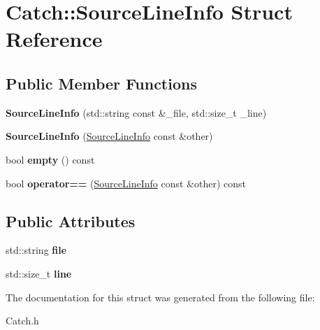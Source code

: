 \hypertarget{struct_catch_1_1_source_line_info}{\section{Catch\-:\-:Source\-Line\-Info Struct Reference}
\label{struct_catch_1_1_source_line_info}
}
\subsection*{Public Member Functions}
\begin{DoxyCompactItemize}
\item 
\hypertarget{struct_catch_1_1_source_line_info_ad75af709941dae9fcb07b7c5cd18294f}{{\bfseries Source\-Line\-Info} (std\-::string const \&\-\_\-file, std\-::size\-\_\-t \-\_\-line)}\label{struct_catch_1_1_source_line_info_ad75af709941dae9fcb07b7c5cd18294f}

\item 
\hypertarget{struct_catch_1_1_source_line_info_a1ec99cc0547ce5909133aaa8f14ed4b1}{{\bfseries Source\-Line\-Info} (\hyperlink{struct_catch_1_1_source_line_info}{Source\-Line\-Info} const \&other)}\label{struct_catch_1_1_source_line_info_a1ec99cc0547ce5909133aaa8f14ed4b1}

\item 
\hypertarget{struct_catch_1_1_source_line_info_a9a25ffc0640d1a3dd0c9b7e5fcbba7b9}{bool {\bfseries empty} () const }\label{struct_catch_1_1_source_line_info_a9a25ffc0640d1a3dd0c9b7e5fcbba7b9}

\item 
\hypertarget{struct_catch_1_1_source_line_info_af0854821b1abfda52796ef0f1294b050}{bool {\bfseries operator==} (\hyperlink{struct_catch_1_1_source_line_info}{Source\-Line\-Info} const \&other) const }\label{struct_catch_1_1_source_line_info_af0854821b1abfda52796ef0f1294b050}

\end{DoxyCompactItemize}
\subsection*{Public Attributes}
\begin{DoxyCompactItemize}
\item 
\hypertarget{struct_catch_1_1_source_line_info_adf3ccf0c2bd326eb3466318af82a94dd}{std\-::string {\bfseries file}}\label{struct_catch_1_1_source_line_info_adf3ccf0c2bd326eb3466318af82a94dd}

\item 
\hypertarget{struct_catch_1_1_source_line_info_a841e5d696c7b9cde24e45e61dd979c77}{std\-::size\-\_\-t {\bfseries line}}\label{struct_catch_1_1_source_line_info_a841e5d696c7b9cde24e45e61dd979c77}

\end{DoxyCompactItemize}


The documentation for this struct was generated from the following file\-:\begin{DoxyCompactItemize}
\item 
Catch.\-h\end{DoxyCompactItemize}
